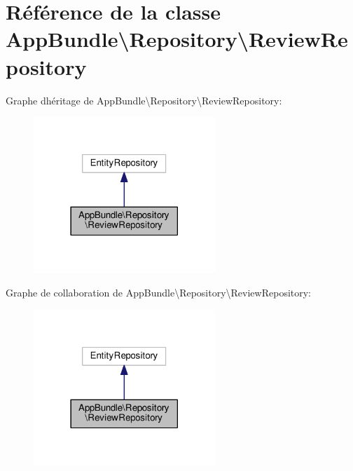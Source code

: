 \hypertarget{classAppBundle_1_1Repository_1_1ReviewRepository}{}\section{Référence de la classe App\+Bundle\textbackslash{}Repository\textbackslash{}Review\+Repository}
\label{classAppBundle_1_1Repository_1_1ReviewRepository}


Graphe d\textquotesingle{}héritage de App\+Bundle\textbackslash{}Repository\textbackslash{}Review\+Repository\+:\nopagebreak
\begin{figure}[H]
\begin{center}
\leavevmode
\includegraphics[width=194pt]{classAppBundle_1_1Repository_1_1ReviewRepository__inherit__graph}
\end{center}
\end{figure}


Graphe de collaboration de App\+Bundle\textbackslash{}Repository\textbackslash{}Review\+Repository\+:\nopagebreak
\begin{figure}[H]
\begin{center}
\leavevmode
\includegraphics[width=194pt]{classAppBundle_1_1Repository_1_1ReviewRepository__coll__graph}
\end{center}
\end{figure}


